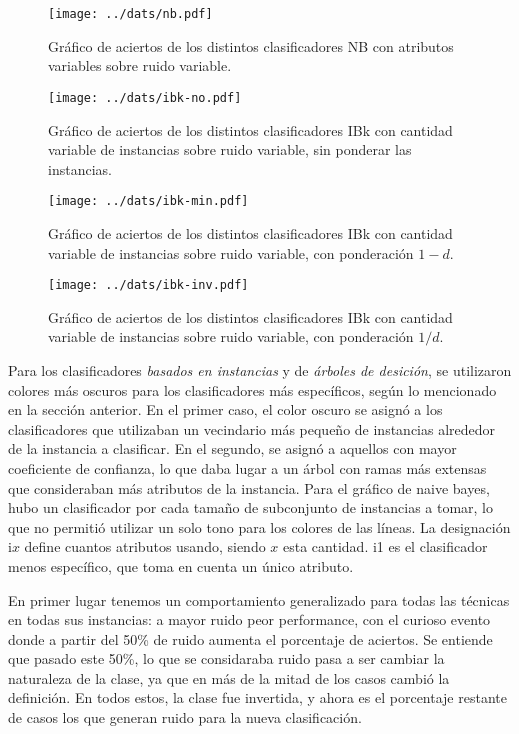 \documentclass[a4paper,10pt]{article}
\begin{document}
\begin{figure}[h]
\centering
\texttt{[image: ../dats/nb.pdf]}
\caption{Gráfico de aciertos de los distintos clasificadores \textsf{NB} con atributos variables sobre ruido variable.}\label{fig:nb}
\end{figure}

\begin{figure}[h]
\centering
\texttt{[image: ../dats/ibk-no.pdf]}
\caption{Gráfico de aciertos de los distintos clasificadores \textsf{IBk} con cantidad variable de instancias sobre ruido variable, sin ponderar las instancias.}\label{fig:ibk-no}
\end{figure}

\begin{figure}[h]
\centering
\texttt{[image: ../dats/ibk-min.pdf]}
\caption{Gráfico de aciertos de los distintos clasificadores \textsf{IBk} con cantidad variable de instancias sobre ruido variable, con ponderación $1-d$.}\label{fig:ibk-min}
\end{figure}

\begin{figure}[h]
\centering
\texttt{[image: ../dats/ibk-inv.pdf]}
\caption{Gráfico de aciertos de los distintos clasificadores \textsf{IBk} con cantidad variable de instancias sobre ruido variable, con ponderación $1/d$.}\label{fig:ibk-inv}
\end{figure}


Para los clasificadores \emph{basados en instancias} y de \emph{árboles de desición}, se utilizaron colores más oscuros para los clasificadores más específicos, según lo mencionado en la sección anterior. En el primer caso, el color oscuro se asignó a los clasificadores que utilizaban un vecindario más pequeño de instancias alrededor de la instancia a clasificar. En el segundo, se asignó a aquellos con mayor coeficiente de confianza, lo que daba lugar a un árbol con ramas más extensas que consideraban más atributos de la instancia. Para el gráfico de \textsf{naive bayes}, hubo un clasificador por cada tamaño de subconjunto de instancias a tomar, lo que no permitió utilizar un solo tono para los colores de las líneas. La designación i$x$ define cuantos atributos usando, siendo $x$ esta cantidad. \textsf{i1} es el clasificador menos específico, que toma en cuenta un único atributo.

En primer lugar tenemos un comportamiento generalizado para todas las técnicas en todas sus instancias: a mayor ruido peor performance, con el curioso evento donde a partir del 50\% de ruido aumenta el porcentaje de aciertos. Se entiende que pasado este 50\%, lo que se considaraba ruido pasa a ser cambiar la naturaleza de la clase, ya que en más de la mitad de los casos cambió la definición. En todos estos, la clase fue invertida, y ahora es el porcentaje restante de casos los que generan ruido para la nueva clasificación.
\end{document}
